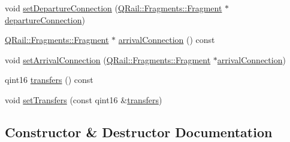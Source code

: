 \begin{DoxyCompactItemize}
\item 
void \mbox{\hyperlink{classQRail_1_1RouterEngine_1_1StationStopProfile_a2dc446970e1fe208e6e78504db798a4b}{set\+Departure\+Connection}} (\mbox{\hyperlink{classQRail_1_1Fragments_1_1Fragment}{Q\+Rail\+::\+Fragments\+::\+Fragment}} $\ast$\mbox{\hyperlink{classQRail_1_1RouterEngine_1_1StationStopProfile_a53d2c7657b133546264a89cb309999bb}{departure\+Connection}})
\item 
\mbox{\hyperlink{classQRail_1_1Fragments_1_1Fragment}{Q\+Rail\+::\+Fragments\+::\+Fragment}} $\ast$ \mbox{\hyperlink{classQRail_1_1RouterEngine_1_1StationStopProfile_ae06073b8f69ae105c0219234ebba77b8}{arrival\+Connection}} () const
\item 
void \mbox{\hyperlink{classQRail_1_1RouterEngine_1_1StationStopProfile_a76b755a606e7e1f5df8bbeb662c7d7cd}{set\+Arrival\+Connection}} (\mbox{\hyperlink{classQRail_1_1Fragments_1_1Fragment}{Q\+Rail\+::\+Fragments\+::\+Fragment}} $\ast$\mbox{\hyperlink{classQRail_1_1RouterEngine_1_1StationStopProfile_ae06073b8f69ae105c0219234ebba77b8}{arrival\+Connection}})
\item 
qint16 \mbox{\hyperlink{classQRail_1_1RouterEngine_1_1StationStopProfile_ac63915d0c5d865e3fdf02654d4ca53bc}{transfers}} () const
\item 
void \mbox{\hyperlink{classQRail_1_1RouterEngine_1_1StationStopProfile_a5b7261d44216081b3d05e5f06278ff95}{set\+Transfers}} (const qint16 \&\mbox{\hyperlink{classQRail_1_1RouterEngine_1_1StationStopProfile_ac63915d0c5d865e3fdf02654d4ca53bc}{transfers}})
\end{DoxyCompactItemize}


\subsection{Constructor \& Destructor Documentation}
\mbox{\label{classQRail_1_1RouterEngine_1_1StationStopProfile_ae528f7c8cecbb94459a2355efc1063bf}} 
